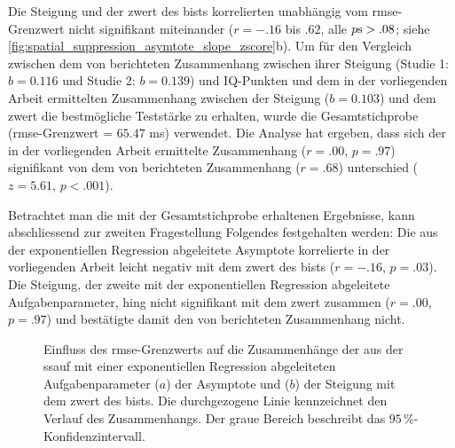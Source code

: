 \documentclass[11pt, twoside, a4paper]{book}		%
\begin{document}
Die Steigung und der \gls{zwert} des \gls{bist}s korrelierten unabhängig vom \gls{rmse}-Grenzwert nicht signifikant miteinander ($r=-.16$ bis $.62$, alle $p\textnormal{s}>.08$; siehe \autoref{fig:spatial_suppression_asymtote_slope_zscore}b). 
Um für den Vergleich zwischen dem von \citet{Melnick2013} berichteten Zusammenhang zwischen ihrer Steigung (Studie 1: $b=0.116$ und Studie 2: $b=0.139$) und IQ-Punkten und dem in der vorliegenden Arbeit ermittelten Zusammenhang zwischen der Steigung ($b=0.103$) und dem \gls{zwert} die bestmögliche Teststärke zu erhalten, wurde die Gesamtstichprobe (\gls{rmse}-Grenzwert = $65.47$ ms) verwendet. Die Analyse hat ergeben, dass sich der in der vorliegenden Arbeit ermittelte Zusammenhang ($r=.00$, $p=.97$) signifikant von dem von \citeauthor{Melnick2013} berichteten Zusammenhang ($r=.68$) unterschied ($z=5.61$, $p<.001$).

Betrachtet man die mit der Gesamtstichprobe erhaltenen Ergebnisse, kann abschliessend zur zweiten Fragestellung Folgendes festgehalten werden:  
Die aus der exponentiellen Regression abgeleitete Asymptote korrelierte in der vorliegenden Arbeit leicht negativ mit dem \gls{zwert} des \gls{bist}s ($r=-.16$, $p=.03$). Die Steigung, der zweite mit der exponentiellen Regression abgeleitete Aufgabenparameter, hing nicht signifikant mit dem \gls{zwert} zusammen ($r=.00$, $p=.97$) und bestätigte damit den von \citet{Melnick2013} berichteten Zusammenhang nicht. 

\begin{figure}[htbp]
	\centering
	\begin{adjustbox}{width=1\textwidth}
	\end{adjustbox}
	\newline
	\begin{adjustbox}{width=1\textwidth}
	\end{adjustbox}
	
	\caption[Einfluss des \gls{rmse}-Grenzwerts der \gls{ssauf} auf den Zusammenhang zwischen der Asymptote, der Steigung und dem \gls{zwert} des \gls{bist}s]{Einfluss des \gls{rmse}-Grenzwerts auf die Zusammenhänge der aus der \gls{ssauf} mit einer exponentiellen Regression abgeleiteten Aufgabenparameter ($a$) der Asymptote  und ($b$) der Steigung  mit dem \gls{zwert} des \gls{bist}s. Die durchgezogene Linie kennzeichnet den Verlauf des Zusammenhangs. Der graue Bereich beschreibt das $95\,\%$-Konfidenzintervall.}
	\label{fig:spatial_suppression_asymtote_slope_zscore}
\end{figure}
\end{document}
